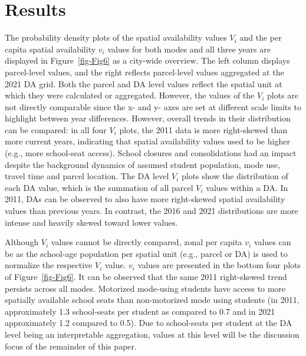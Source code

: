 \documentclass[
default
]{sn-jnl}
\begin{document}
\section{Results}\label{results}

The probability density plots of the spatial availability values \(V_i\)
and the per capita spatial availability \(v_i\) values for both modes
and all three years are displayed in Figure~\ref{fig-Fig6} as a
city-wide overview. The left column displays parcel-level values, and
the right reflects parcel-level values aggregated at the 2021 DA grid.
Both the parcel and DA level values reflect the spatial unit at which
they were calculated or aggregated. However, the values of the \(V_i\)
plots are not directly comparable since the x- and y- axes are set at
different scale limits to highlight between year differences. However,
overall trends in their distribution can be compared: in all four
\(V_i\) plots, the 2011 data is more right-skewed than more current
years, indicating that spatial availability values used to be higher
(e.g., more school-seat access). School closures and consolidations had
an impact despite the background dynamics of assumed student population,
mode use, travel time and parcel location. The DA level \(V_i\) plots
show the distribution of each DA value, which is the summation of all
parcel \(V_i\) values within a DA. In 2011, DAs can be observed to also
have more right-skewed spatial availability values than previous years.
In contrast, the 2016 and 2021 distributions are more intense and
heavily skewed toward lower values.

Although \(V_i\) values cannot be directly compared, zonal per capita
\(v_i\) values can be as the school-age population per spatial unit
(e.g., parcel or DA) is used to normalize the respective \(V_i\) value.
\(v_i\) values are presented in the bottom four plots of
Figure~\ref{fig-Fig6}. It can be observed that the same 2011
right-skewed trend persists across all modes. Motorized mode-using
students have access to more spatially available school seats than
non-motorized mode using students (in 2011, approximately 1.3
school-seats per student as compared to 0.7 and in 2021 approximately
1.2 compared to 0.5). Due to school-seats per student at the DA level
being an interpretable aggregation, values at this level will be the
discussion focus of the remainder of this paper.
\end{document}
